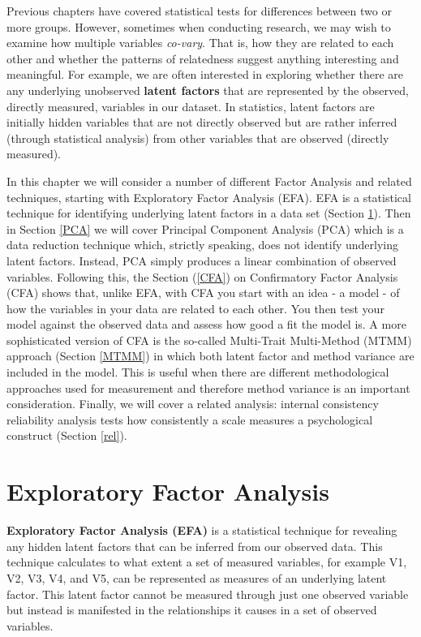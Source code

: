 \documentclass[
]{book}
\begin{document}
Previous chapters have covered statistical tests for differences between two or more groups. However, sometimes when conducting research, we may wish to examine how multiple variables \emph{co-vary}. That is, how they are related to each other and whether the patterns of relatedness suggest anything interesting and meaningful. For example, we are often interested in exploring whether there are any underlying unobserved {\textbf{latent factors}} that are represented by the observed, directly measured, variables in our dataset. In statistics, latent factors are initially hidden variables that are not directly observed but are rather inferred (through statistical analysis) from other variables that are observed (directly measured).

In this chapter we will consider a number of different Factor Analysis and related techniques, starting with Exploratory Factor Analysis (EFA). EFA is a statistical technique for identifying underlying latent factors in a data set (Section \ref{EFA}). Then in Section \ref{PCA} we will cover Principal Component Analysis (PCA) which is a data reduction technique which, strictly speaking, does not identify underlying latent factors. Instead, PCA simply produces a linear combination of observed variables. Following this, the Section (\ref{CFA}) on Confirmatory Factor Analysis (CFA) shows that, unlike EFA, with CFA you start with an idea - a model - of how the variables in your data are related to each other. You then test your model against the observed data and assess how good a fit the model is. A more sophisticated version of CFA is the so-called Multi-Trait Multi-Method (MTMM) approach (Section \ref{MTMM}) in which both latent factor and method variance are included in the model. This is useful when there are different methodological approaches used for measurement and therefore method variance is an important consideration. Finally, we will cover a related analysis: internal consistency reliability analysis tests how consistently a scale measures a psychological construct (Section \ref{rel}).

\hypertarget{EFA}{%
\section{Exploratory Factor Analysis}\label{EFA}}

{\textbf{Exploratory Factor Analysis (EFA)}} is a statistical technique for revealing any hidden latent factors that can be inferred from our observed data. This technique calculates to what extent a set of measured variables, for example V1, V2, V3, V4, and V5, can be represented as measures of an underlying latent factor. This latent factor cannot be measured through just one observed variable but instead is manifested in the relationships it causes in a set of observed variables.
\end{document}
